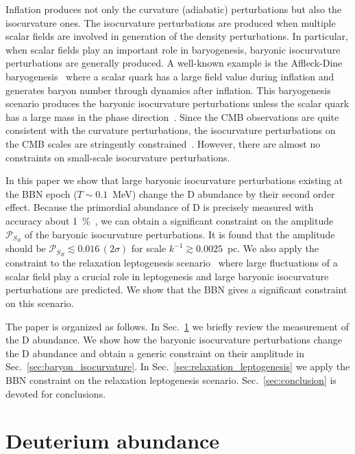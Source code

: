 \documentclass[11pt,a4paper]{article}
\begin{document}
Inflation produces not only the curvature (adiabatic) perturbations but also the isocurvature ones.
The isocurvature perturbations are produced when multiple scalar fields are involved in generation of the density perturbations.
In particular, when scalar fields play an important role in baryogenesis, baryonic isocurvature perturbations are generally produced.
A well-known example is the Affleck-Dine baryogenesis~\cite{Affleck:1984fy} where a scalar quark has a large field value during inflation and generates baryon number through dynamics after inflation. 
This baryogenesis scenario produces the baryonic isocurvature perturbations unless the scalar quark has a large mass in the phase direction~\cite{Enqvist:1998pf,Kasuya:2008xp}.
Since the CMB observations are quite consistent with the curvature perturbations, the isocurvature perturbations on the CMB scales are stringently constrained~\cite{Ade:2015lrj}.
However, there are almost no constraints on small-scale isocurvature perturbations.

In this paper we show that large baryonic isocurvature perturbations existing at the BBN epoch ($T\sim 0.1$~MeV) change the D abundance by their second order effect.
Because the primordial abundance of D is precisely measured with accuracy about 1~\%~\cite{Zavarygin:2018dbk,Cooke:2017cwo}, we can obtain a significant constraint on the amplitude $\mathcal{P}_{S_B}$ of the baryonic isocurvature perturbations. 
It is found that the amplitude should be $\mathcal{P}_{S_B} \lesssim 0.016 \,(2\sigma)$ for scale $k^{-1} \gtrsim 0.0025$~pc. 
We also apply the constraint to the relaxation leptogenesis scenario~\cite{Kusenko:2014lra,Yang:2015ida} where large fluctuations of a scalar field play a crucial role in leptogenesis and large baryonic isocurvature perturbations are predicted.
We show that the BBN gives a significant constraint on this scenario. 

The paper is organized as follows.
In Sec.~\ref{sec:introduction} we briefly review the measurement of the D abundance.
We show how the baryonic isocurvature perturbations change the D abundance and obtain a generic constraint on their amplitude in Sec.~\ref{sec:baryon_isocurvature}. 
In Sec.~\ref{sec:relaxation_leptogenesis} we apply the BBN constraint on the relaxation leptogenesis scenario.
Sec.~\ref{sec:conclusion} is devoted for conclusions.

\section{Deuterium abundance}
\label{sec:introduction}
\end{document}
